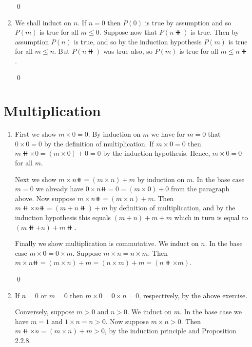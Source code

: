 \begin{enumerate}[Ex. 2.2.1.]
    \qed

    \item We shall induct on $n$. If $n = 0$ then $P(0)$ is true by assumption
    and so $P(m)$ is true for all $m \leq 0$. Suppose now that $P(n\doubleplus)$
    is true. Then by assumption $P(n)$ is true, and so by the induction hypothesis
    $P(m)$ is true for all $m \leq n$. But $P(n\doubleplus)$ was true also, so
    $P(m)$ is true for all $m \leq n\doubleplus$.

    \qed
\end{enumerate}


\section{Multiplication}
\begin{enumerate}[Ex. 2.3.1.]
    \item First we show $m \times 0 = 0$. By induction on $m$ we have for
    $m = 0$ that $0 \times 0 = 0$ by the definition of multiplication. If
    $m \times 0 = 0$ then $m\doubleplus \times 0 = (m \times 0) + 0 = 0$ by
    the induction hypothesis. Hence, $m \times 0 = 0$ for all $m$.

    Next we show $m \times n\doubleplus = (m\times n) + m$ by induction on $m$.
    In the base case $m = 0$ we already have $0\times n\doubleplus = 0 = 
    (m \times 0) + 0$ from the paragraph above. Now suppose 
    $m \times n\doubleplus = (m \times n) + m$. Then $m\doubleplus \times 
    n\doubleplus = (m + n\doubleplus) + m$ by definition of multiplication, and
    by the induction hypothesis this equals $(m + n) + m + m$ which in turn
    is equal to $(m\doubleplus + n) + m\doubleplus$.

    Finally we show multiplication is commutative. We induct on $n$. In the
    base case $m \times 0 = 0 \times m$. Suppose $m \times n = n \times m$.
    Then $m \times n\doubleplus = (m \times n) + m = (n \times m) + m= 
    (n\doubleplus \times m)$.

    \qed

    \item If $n = 0$ or $m = 0$ then $m \times 0 = 0 \times n = 0$, 
    respectively, by the above exercise. 

    Conversely, suppose $m > 0$ and $n > 0$. We induct on $m$. In the base case
    we have $m = 1$ and $1 \times n = n > 0$. Now suppose $m \times n > 0$.
    Then $m\doubleplus \times n = (m \times n) + m > 0$, by the induction 
    principle and Proposition 2.2.8.


\end{enumerate}
